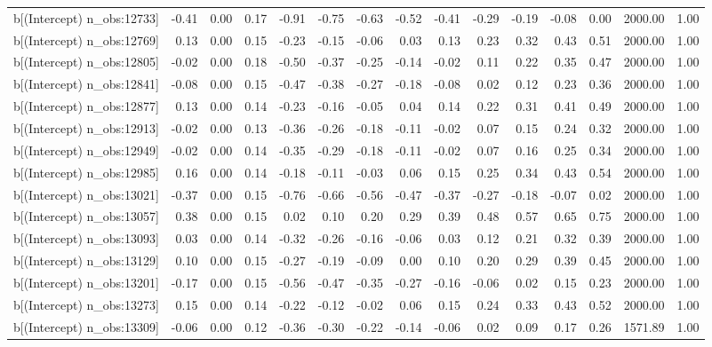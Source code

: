 \begin{table}[ht]
\begin{tabular}{rrrrrrrrrrrrrrr}
  b[(Intercept) n\_obs:12733] & -0.41 & 0.00 & 0.17 & -0.91 & -0.75 & -0.63 & -0.52 & -0.41 & -0.29 & -0.19 & -0.08 & 0.00 & 2000.00 & 1.00 \\ 
  b[(Intercept) n\_obs:12769] & 0.13 & 0.00 & 0.15 & -0.23 & -0.15 & -0.06 & 0.03 & 0.13 & 0.23 & 0.32 & 0.43 & 0.51 & 2000.00 & 1.00 \\ 
  b[(Intercept) n\_obs:12805] & -0.02 & 0.00 & 0.18 & -0.50 & -0.37 & -0.25 & -0.14 & -0.02 & 0.11 & 0.22 & 0.35 & 0.47 & 2000.00 & 1.00 \\ 
  b[(Intercept) n\_obs:12841] & -0.08 & 0.00 & 0.15 & -0.47 & -0.38 & -0.27 & -0.18 & -0.08 & 0.02 & 0.12 & 0.23 & 0.36 & 2000.00 & 1.00 \\ 
  b[(Intercept) n\_obs:12877] & 0.13 & 0.00 & 0.14 & -0.23 & -0.16 & -0.05 & 0.04 & 0.14 & 0.22 & 0.31 & 0.41 & 0.49 & 2000.00 & 1.00 \\ 
  b[(Intercept) n\_obs:12913] & -0.02 & 0.00 & 0.13 & -0.36 & -0.26 & -0.18 & -0.11 & -0.02 & 0.07 & 0.15 & 0.24 & 0.32 & 2000.00 & 1.00 \\ 
  b[(Intercept) n\_obs:12949] & -0.02 & 0.00 & 0.14 & -0.35 & -0.29 & -0.18 & -0.11 & -0.02 & 0.07 & 0.16 & 0.25 & 0.34 & 2000.00 & 1.00 \\ 
  b[(Intercept) n\_obs:12985] & 0.16 & 0.00 & 0.14 & -0.18 & -0.11 & -0.03 & 0.06 & 0.15 & 0.25 & 0.34 & 0.43 & 0.54 & 2000.00 & 1.00 \\ 
  b[(Intercept) n\_obs:13021] & -0.37 & 0.00 & 0.15 & -0.76 & -0.66 & -0.56 & -0.47 & -0.37 & -0.27 & -0.18 & -0.07 & 0.02 & 2000.00 & 1.00 \\ 
  b[(Intercept) n\_obs:13057] & 0.38 & 0.00 & 0.15 & 0.02 & 0.10 & 0.20 & 0.29 & 0.39 & 0.48 & 0.57 & 0.65 & 0.75 & 2000.00 & 1.00 \\ 
  b[(Intercept) n\_obs:13093] & 0.03 & 0.00 & 0.14 & -0.32 & -0.26 & -0.16 & -0.06 & 0.03 & 0.12 & 0.21 & 0.32 & 0.39 & 2000.00 & 1.00 \\ 
  b[(Intercept) n\_obs:13129] & 0.10 & 0.00 & 0.15 & -0.27 & -0.19 & -0.09 & 0.00 & 0.10 & 0.20 & 0.29 & 0.39 & 0.45 & 2000.00 & 1.00 \\ 
  b[(Intercept) n\_obs:13201] & -0.17 & 0.00 & 0.15 & -0.56 & -0.47 & -0.35 & -0.27 & -0.16 & -0.06 & 0.02 & 0.15 & 0.23 & 2000.00 & 1.00 \\ 
  b[(Intercept) n\_obs:13273] & 0.15 & 0.00 & 0.14 & -0.22 & -0.12 & -0.02 & 0.06 & 0.15 & 0.24 & 0.33 & 0.43 & 0.52 & 2000.00 & 1.00 \\ 
  b[(Intercept) n\_obs:13309] & -0.06 & 0.00 & 0.12 & -0.36 & -0.30 & -0.22 & -0.14 & -0.06 & 0.02 & 0.09 & 0.17 & 0.26 & 1571.89 & 1.00 \\ 

\end{tabular}
\end{table}
